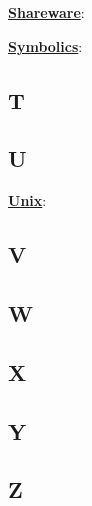 \underline{\textbf{Shareware}}: %

\underline{\textbf{Symbolics}}: %

\subsection{T}

\subsection{U}

\underline{\textbf{Unix}}: %

\subsection{V}

\subsection{W}

\subsection{X}

\subsection{Y}

\subsection{Z}


	



